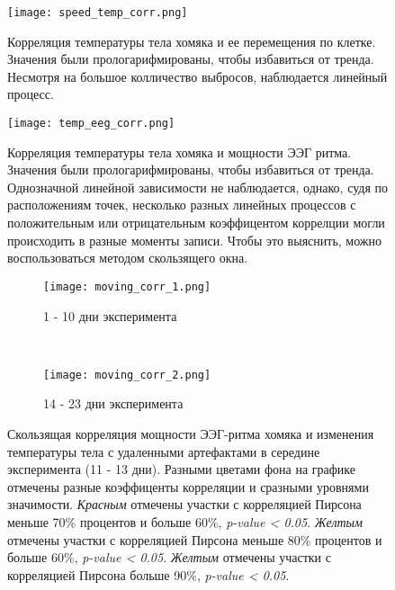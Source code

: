 \documentclass[12pt,a4paper,oneside]{article}
\begin{document}
\begin{figure}
  \centering
  \texttt{[image: speed\_temp\_corr.png]}
  \caption{Корреляция температуры тела хомяка и ее перемещения по клетке. Значения были прологарифмированы, чтобы избавиться от тренда. Несмотря на большое колличество выбросов, наблюдается линейный процесс.}
  \label{fig:speed_temp_corr}
\end{figure}

\begin{figure}
  \centering
  \texttt{[image: temp\_eeg\_corr.png]}
  \caption{Корреляция температуры тела хомяка и мощности ЭЭГ ритма. Значения были прологарифмированы, чтобы избавиться от тренда. Однозначной линейной зависимости не наблюдается, однако, судя по расположениям точек, несколько разных линейных процессов с положительным или отрицательным коэффицентом коррелции могли происходить в разные моменты записи. Чтобы это выяснить, можно воспользоваться методом скользящего окна.}
  \label{fig:temp_eeg_corr}
\end{figure}

\begin{figure}

	\centering
    \begin{subfigure}[a]{0.9\textwidth}
        \texttt{[image: moving\_corr\_1.png]}
        \caption{1 - 10 дни эксперимента}
        \label{fig:moving_corr_1}
    \end{subfigure}
    ~
    \begin{subfigure}[b]{0.9\textwidth}
        \texttt{[image: moving\_corr\_2.png]}
        \caption{14 - 23 дни эксперимента}
        \label{fig:moving_corr_2}
    \end{subfigure}

    \caption{Скользящая корреляция мощности ЭЭГ-ритма хомяка и изменения температуры тела с удаленными артефактами в середине эксперимента (11 - 13 дни). Разными цветами фона на графике отмечены разные коэффиценты корреляции и сразными уровнями значимости. \textit{Красным} отмечены участки с корреляцией Пирсона меньше 70\% процентов и больше 60\%, \textit{p-value < 0.05}. \textit{Желтым} отмечены участки с корреляцией Пирсона меньше 80\% процентов и больше 60\%, \textit{p-value < 0.05}. \textit{Желтым} отмечены участки с корреляцией Пирсона больше 90\%, \textit{p-value < 0.05}.}\label{fig:moving_corr}
\end{figure}



\end{document}
